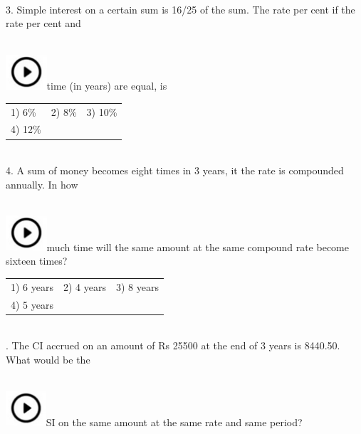 \documentclass{article}
\begin{document}
	\noindent  \\ 
	
	3.   Simple interest on a certain sum is 16/25 of the sum. The rate per cent if the rate per cent and  
	 
	\noindent \\ \includegraphics*[width=0.60in, height=0.52in]{images/image1}time (in years) are equal, is
	
	\noindent \begin{tabular}{p{1.7in} p{1.6in} p{1.6in}} \\ 
 1) 6\%                      & 2) 8\%                & 3) 10\%              \\
4) 12\% \\
\end{tabular}
	
\noindent \\ 	4.   A sum of money becomes eight times in 3 years, it the rate is compounded annually. In how  
	 
	\noindent \\ \includegraphics*[width=0.60in, height=0.52in]{images/image1}much time will the same amount at the same compound rate become sixteen times?
	
	\noindent \begin{tabular}{p{1.7in} p{1.6in} p{1.6in}} \\ 
 1) 6 years               & 2) 4 years         & 3) 8 years         \\
4) 5 years \\
\end{tabular}
	
	\noindent 
	
	\noindent  \\ 
	
	.   The CI accrued on an amount of Rs 25500 at the end of 3 years is 8440.50. What would be the
	
	\noindent 
	
	\noindent  
	 
	\noindent \\ \includegraphics*[width=0.59in, height=0.52in]{images/image1}SI on the same amount at the same rate and same period?
	
\end{document}
